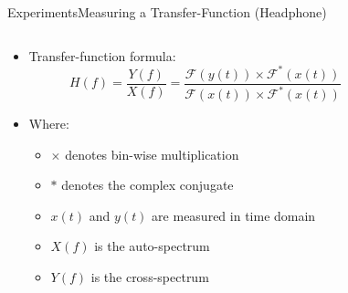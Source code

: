 \begin{frame}{Experiments}{Measuring a Transfer-Function (Headphone)}		
	\begin{columns}
		\begin{column}{0.5\textwidth}
			\begin{itemize}
				\item Transfer-function formula:
				\begin{equation*}
				H(f)=\frac{Y(f)}{X(f)}=\frac{\mathscr{F}(y(t))\times\mathscr{F}^{\ast}(x(t))}{\mathscr{F}(x(t))\times\mathscr{F}^{\ast}(x(t))}
				\end{equation*}
				\item Where:
				\begin{itemize}
					\item[] $\times$ denotes bin-wise multiplication
					\item[] $\ast$ denotes the complex conjugate
					\item[] $x(t)$ and $y(t)$ are measured in time domain
					\item[] $X(f)$ is the auto-spectrum
					\item[] $Y (f)$ is the cross-spectrum
				\end{itemize}
			\end{itemize}
		\end{column}
		\begin{column}{0.5\textwidth} 



		\end{column}
	\end{columns}
\end{frame}

